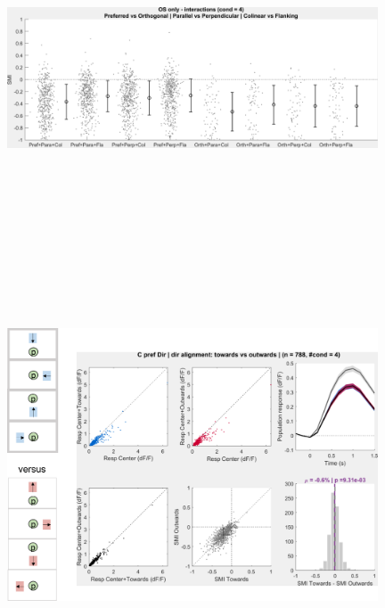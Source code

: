 \begin{figure}[H] \centering \includegraphics[width=11cm,height=11cm,keepaspectratio]{Figures/7.Results/population/sel/31_popPlots_VisROIs_COS_2SalignmentAngle.png} 
\end{figure}

\begin{figure}[H] \centering \includegraphics[width=11cm,height=11cm,keepaspectratio]{Figures/7.Results/population/sel/diagrams/17.png} 
\end{figure}


